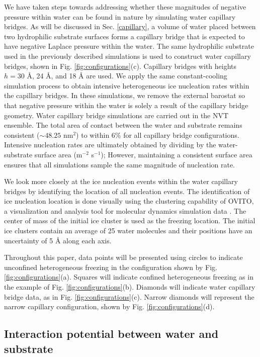\documentclass[journal abbreviation, manuscript]{copernicus}
\begin{document}
We have taken steps towards addressing whether these magnitudes of negative pressure within water can be found in nature by simulating water capillary bridges. As will be discussed in Sec. \ref{capillary}, a volume of water placed between two hydrophilic substrate surfaces forms a capillary bridge that is expected to have negative Laplace pressure within the water. The same hydrophilic substrate used in the previously described simulations is used to construct water capillary bridges, shown in Fig. \ref{fig:configurations}(c). Capillary bridges with heights $h = 30$ \AA{}, 24 \AA{}, and 18 \AA{} are used. We apply the same constant-cooling simulation process to obtain intensive heterogeneous ice nucleation rates within the capillary bridges. In these simulations, we remove the external barostat so that negative pressure within the water is solely a result of the capillary bridge geometry. Water capillary bridge simulations are carried out in the NVT ensemble. The total area of contact between the water and substrate remains consistent ($\sim 48.25$ nm$^2$) to within 6\% for all capillary bridge configurations. Intensive nucleation rates are ultimately obtained by dividing by the water-substrate surface area (m$^{-2}$ s$^{-1}$); However, maintaining a consistent surface area ensures that all simulations sample the same magnitude of nucleation rate.

We look more closely at the ice nucleation events within the water capillary bridges by identifying the location of all nucleation events. The identification of ice nucleation location is done visually using the clustering capability of OVITO, a visualization and analysis tool for molecular dynamics simulation data \citep{ovito}. The center of mass of the initial ice cluster is used as the freezing location. The initial ice clusters contain an average of 25 water molecules and their positions have an uncertainty of 5 \AA{} along each axis.

Throughout this paper, data points will be presented using circles to indicate unconfined heterogeneous freezing in the configuration shown by Fig. \ref{fig:configurations}(a). Squares will indicate confined heterogeneous freezing as in the example of Fig. \ref{fig:configurations}(b). Diamonds will indicate water capillary bridge data, as in Fig. \ref{fig:configurations}(c). Narrow diamonds will represent the narrow capillary configuration, shown by Fig. \ref{fig:configurations}(d).



\subsection{Interaction potential between water and substrate}
\end{document}
